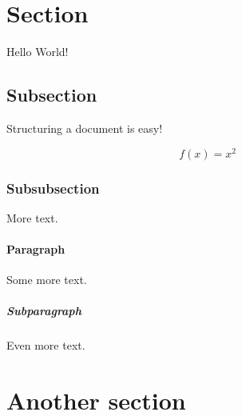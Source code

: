\documentclass{article}
\begin{document}
\section{Section}

Hello World!

\subsection{Subsection}

Structuring a document is easy!



\begin{equation*}
  f(x) = x^2
\end{equation*}

\subsubsection{Subsubsection}

More text.

\paragraph{Paragraph}

Some more text.

\subparagraph{Subparagraph}

Even more text.

\section{Another section}
\end{document}
